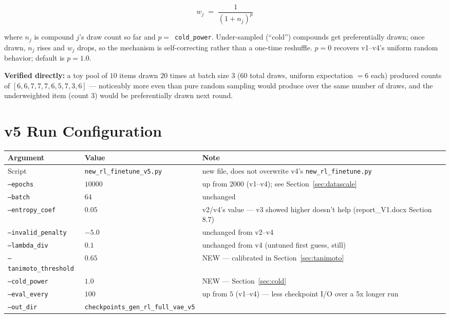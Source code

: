\documentclass[11pt]{article}
\newcommand{\code}[1]{\texttt{#1}}
\begin{document}
\[
  \boxed{\; w_j \;=\; \dfrac{1}{\left(1 + n_j\right)^{p}} \;}
\]

where $n_j$ is compound $j$'s draw count so far and $p = $~\code{cold\_power}. Under-sampled (``cold'') compounds get preferentially drawn; once drawn, $n_j$ rises and $w_j$ drops, so the mechanism is self-correcting rather than a one-time reshuffle. $p=0$ recovers v1--v4's uniform random behavior; default is $p = 1.0$.

\textbf{Verified directly:} a toy pool of $10$ items drawn $20$ times at batch size $3$ ($60$ total draws, uniform expectation $=6$ each) produced counts of $[6, 6, 7, 7, 7, 6, 5, 7, 3, 6]$ --- noticeably more even than pure random sampling would produce over the same number of draws, and the underweighted item (count $3$) would be preferentially drawn next round.

\section{v5 Run Configuration}

\begin{center}
\begin{tabular}{@{}l l p{}@{}}
\toprule
\textbf{Argument} & \textbf{Value} & \textbf{Note} \\
\midrule
Script & \code{\small new\_rl\_finetune\_v5.py} & new file, does not overwrite v4's \code{\small new\_rl\_finetune.py} \\
\code{--epochs} & $10000$ & up from $2000$ (v1--v4); see Section~\ref{sec:datascale} \\
\code{--batch} & $64$ & unchanged \\
\code{--entropy\_coef} & $0.05$ & v2/v4's value --- v3 showed higher doesn't help (report\_V1.docx Section 8.7) \\
\code{--invalid\_penalty} & $-5.0$ & unchanged from v2--v4 \\
\code{--lambda\_div} & $0.1$ & unchanged from v4 (untuned first guess, still) \\
\code{--tanimoto\_threshold} & $0.65$ & NEW --- calibrated in Section~\ref{sec:tanimoto} \\
\code{--cold\_power} & $1.0$ & NEW --- Section~\ref{sec:cold} \\
\code{--eval\_every} & $100$ & up from $5$ (v1--v4) --- less checkpoint I/O over a 5x longer run \\
\code{--out\_dir} & \code{checkpoints\_gen\_rl\_full\_vae\_v5} & \\
\bottomrule
\end{tabular}
\end{center}
\end{document}

